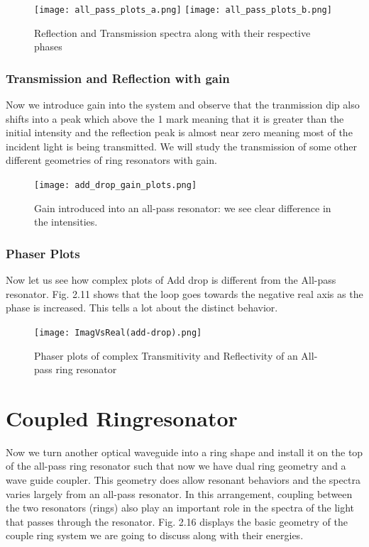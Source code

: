 \begin{figure}[h]
\centering
\texttt{[image: all\_pass\_plots\_a.png]}
\texttt{[image: all\_pass\_plots\_b.png]}
\caption{Reflection and Transmission spectra along with their respective phases}
\end{figure}

\subsubsection{Transmission and Reflection with gain}
Now we introduce gain into the system and observe that the tranmission dip also shifts into a peak which above the 1 mark meaning that it is greater than the initial intensity and the reflection peak is almost near zero meaning most of the incident light is being transmitted. We will study the transmission of some other different geometries of ring resonators with gain. 


\begin{figure}[h]
\centering
\texttt{[image: add\_drop\_gain\_plots.png]}
\caption{Gain introduced into an all-pass resonator: we see clear difference in the intensities.}
\end{figure}
\newpage


\subsubsection{Phaser Plots}
Now let us see how complex plots of Add drop is different from the All-pass resonator. Fig. 2.11 shows that the loop goes towards the negative real axis as the phase is increased. This tells a lot about the distinct behavior.

\begin{figure}[h]
\centering
\texttt{[image: ImagVsReal(add-drop).png]}
\caption{Phaser plots of complex Transmitivity and Reflectivity of an All-pass ring resonator}
\end{figure}

\section{Coupled Ringresonator}
Now we turn another optical waveguide into a ring shape and install it on the top of the all-pass ring resonator such that now we have dual ring geometry and a wave guide coupler. This geometry does allow resonant behaviors and the spectra varies largely from an all-pass resonator.
In this arrangement, coupling between the two resonators (rings) also play an important role in the spectra of the light that passes through the resonator. Fig. 2.16 displays the basic geometry of the couple ring system we are going to discuss along with their energies. 

